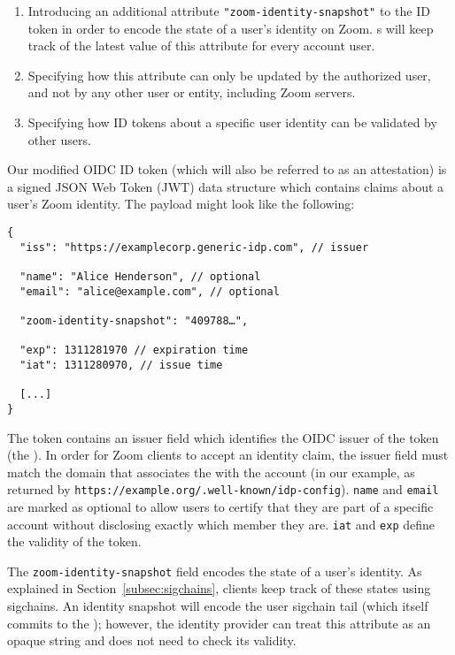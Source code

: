\begin{enumerate}
\item Introducing an additional attribute \texttt{"zoom-identity-snapshot"} to the ID token in order
    to encode the state of a user’s identity on Zoom. {\idp}s will keep track of the latest value of
    this attribute for every account user.
\item Specifying how this attribute can only be updated by the authorized user, and not by any other
    user or entity, including Zoom servers.
\item Specifying how ID tokens about a specific user identity can be validated by other users.
\end{enumerate}

Our modified OIDC ID token (which will also be referred to as an \idp attestation) is a signed JSON
Web Token (JWT) data structure which contains claims about a user’s Zoom identity. The payload might
look like the following:

\begingroup{}
\fontsize{10pt}{12pt}\selectfont{}
\begin{verbatim}
{
  "iss": "https://examplecorp.generic-idp.com", // issuer

  "name": "Alice Henderson", // optional
  "email": "alice@example.com", // optional

  "zoom-identity-snapshot": "409788…",

  "exp": 1311281970 // expiration time
  "iat": 1311280970, // issue time

  [...]
}
\end{verbatim}
\endgroup{}

The token contains an issuer field which identifies the OIDC issuer of the token (the \idp). In
order for Zoom clients to accept an identity claim, the issuer field must match the domain that
associates the \idp with the account (in our example, as returned by
\texttt{https://example.org/.well-known/idp-config}). \texttt{name} and \texttt{email} are marked as
optional to allow users to certify that they are part of a specific account without disclosing
exactly which member they are. \texttt{iat} and \texttt{exp} define the validity of the token.

The \texttt{zoom-identity-snapshot} field encodes the state of a user’s identity. As explained in
Section~\ref{subsec:sigchains}, clients keep track of these states using sigchains. An identity
snapshot will encode the user sigchain tail (which itself commits to the \userID); however, the identity provider can treat
this attribute as an opaque string and does not need to check its validity.

